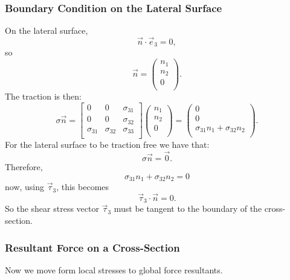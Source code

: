 \subsubsection{Boundary Condition on the Lateral Surface}
On the lateral surface,
\begin{equation*}
  \Vec{n} \cdot \Vec{e}_3 = 0
,\end{equation*}
so
\begin{equation*}
  \Vec{n} = \begin{pmatrix}
    n_1\\
  n_2\\
  0\\
  \end{pmatrix}
.\end{equation*}
The traction is then:
\begin{equation*}
  \sigma \Vec{n} = \begin{bmatrix}
    0 & 0 & \sigma_{31}\\
  0 & 0 & \sigma_{32}\\
  \sigma_{31} & \sigma_{32} & \sigma_{33}\\
  \end{bmatrix} \begin{pmatrix}
    n_1\\
  n_2\\
  0\\
  \end{pmatrix} = \begin{pmatrix}
    0\\
  0\\
  \sigma_{31} n_1 + \sigma_{32} n_2\\
  \end{pmatrix}
.\end{equation*}
For the lateral surface to be traction free we have that:
\begin{equation*}
  \sigma \Vec{n} = \Vec{0}
.\end{equation*}
Therefore,
\begin{equation*}
  \sigma_{31}n_1 + \sigma_{32}n_2 = 0
\end{equation*}
now, using $\Vec{\tau}_3$, this becomes
\begin{equation*}
  \Vec{\tau}_3 \cdot \Vec{n} = 0
.\end{equation*}
So the shear stress vector $\Vec{\tau}_3$ must be tangent to the boundary of the cross-section.

\subsubsection{Resultant Force on a Cross-Section}
Now we move form local stresses to global force resultants.

